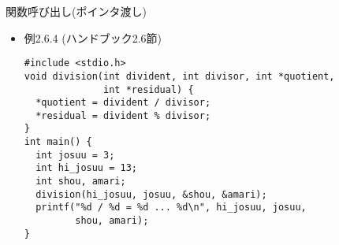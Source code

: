 \begin{frame}[t,fragile]{関数呼び出し(ポインタ渡し)}
  \begin{itemize}
  \item 例2.6.4 (ハンドブック2.6節)
\begin{lstlisting}
#include <stdio.h>
void division(int divident, int divisor, int *quotient,
              int *residual) {
  *quotient = divident / divisor;
  *residual = divident % divisor;
}
int main() {
  int josuu = 3;
  int hi_josuu = 13;
  int shou, amari;
  division(hi_josuu, josuu, &shou, &amari);
  printf("%d / %d = %d ... %d\n", hi_josuu, josuu,
         shou, amari);
}
\end{lstlisting}
  \end{itemize}
\end{frame}
